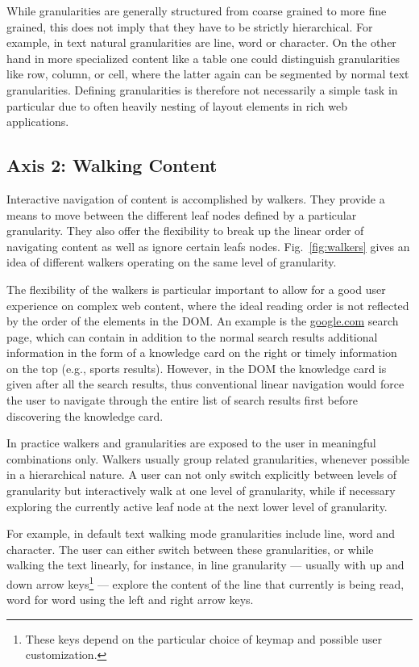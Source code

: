 \documentclass{sig-alternate}
\begin{document}
While granularities are generally structured from coarse grained to more fine
grained, this does not imply that they have to be strictly hierarchical. For
example, in text natural granularities are line, word or character. On the other
hand in more specialized content like a table one could distinguish
granularities like row, column, or cell, where the latter again can be segmented
by normal text granularities.  Defining granularities is therefore not
necessarily a simple task in particular due to often heavily nesting of layout
elements in rich web applications.

\subsection{Axis 2: Walking Content}
\label{sec:ax2}

Interactive navigation of content is accomplished by walkers.  They provide a
means to move between the different leaf nodes defined by a particular
granularity. They also offer the flexibility to break up the linear order of
navigating content as well as ignore certain leafs nodes. Fig.~\ref{fig:walkers} gives
an idea of different walkers operating on the same level of granularity.

The flexibility of the walkers is particular important to allow for a good user
experience on complex web content, where the ideal reading order is not
reflected by the order of the elements in the DOM. An example is the
\url{google.com} search page, which can contain in addition to the normal search
results additional information in the form of a knowledge card on the right or
timely information on the top (e.g., sports results). However, in the DOM the
knowledge card is given after all the search results, thus conventional linear
navigation would force the user to navigate through the entire list of search
results first before discovering the knowledge card.

In practice walkers and granularities are exposed to the user in meaningful
combinations only. Walkers usually group related granularities, whenever
possible in a hierarchical nature.  A user can not only switch explicitly
between levels of granularity but interactively walk at one level of
granularity, while if necessary exploring the currently active leaf node at the
next lower level of granularity.

For example, in default text walking mode granularities include line, word and
character. The user can either switch between these granularities, or while
walking the text linearly, for instance, in line granularity --- usually with up
and down arrow keys\footnote{These keys depend on the particular choice of
  keymap and possible user customization.}  --- explore the content of the line
that currently is being read, word for word using the left and right arrow keys.
\end{document}
